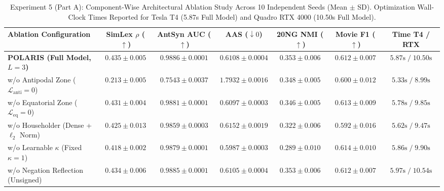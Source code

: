 \documentclass[journal]{IEEEtran}
\begin{document}
\begin{table}[!t]
\centering
\caption{Experiment 5 (Part A): Component-Wise Architectural Ablation Study Across 10 Independent Seeds (Mean $\pm$ SD). Optimization Wall-Clock Times Reported for Tesla T4 (5.87s Full Model) and Quadro RTX 4000 (10.50s Full Model).}
\label{tab:exp5_ablation}
\begin{tabular}{lcccccc}
\toprule
\textbf{Ablation Configuration} & \textbf{SimLex $\rho$ ($\uparrow$)} & \textbf{AntSyn AUC ($\uparrow$)} & \textbf{AAS ($\downarrow 0$)} & \textbf{20NG NMI ($\uparrow$)} & \textbf{Movie F1 ($\uparrow$)} & \textbf{Time T4 / RTX} \\
\midrule
\textbf{POLARIS (Full Model, $L=3$)} & $\mathbf{0.435 \pm 0.005}$ & $\mathbf{0.9886 \pm 0.0001}$ & $0.6108 \pm 0.0004$ & $\mathbf{0.353 \pm 0.006}$ & $0.612 \pm 0.007$ & $5.87\text{s} \;/\; 10.50\text{s}$ \\
w/o Antipodal Zone ($\mathcal{L}_{\text{anti}} = 0$) & $0.213 \pm 0.005$ & $0.7543 \pm 0.0037$ & $1.7932 \pm 0.0016$ & $0.348 \pm 0.005$ & $0.600 \pm 0.012$ & $5.33\text{s} \;/\; 8.99\text{s}$ \\
w/o Equatorial Zone ($\mathcal{L}_{\text{eq}} = 0$) & $0.431 \pm 0.004$ & $0.9881 \pm 0.0001$ & $0.6097 \pm 0.0003$ & $0.346 \pm 0.005$ & $0.613 \pm 0.009$ & $5.78\text{s} \;/\; 9.85\text{s}$ \\
w/o Householder (Dense + $\ell_2$ Norm) & $0.425 \pm 0.013$ & $0.9859 \pm 0.0003$ & $0.6152 \pm 0.0019$ & $0.322 \pm 0.006$ & $0.592 \pm 0.016$ & $5.62\text{s} \;/\; 9.47\text{s}$ \\
w/o Learnable $\kappa$ (Fixed $\kappa = 1$) & $0.418 \pm 0.002$ & $0.9879 \pm 0.0001$ & $\mathbf{0.5987 \pm 0.0003}$ & $0.289 \pm 0.010$ & $\mathbf{0.614 \pm 0.010}$ & $5.86\text{s} \;/\; 9.90\text{s}$ \\
w/o Negation Reflection (Unsigned) & $0.434 \pm 0.006$ & $0.9885 \pm 0.0001$ & $0.6105 \pm 0.0004$ & $\mathbf{0.353 \pm 0.006}$ & $0.612 \pm 0.007$ & $5.97\text{s} \;/\; 10.54\text{s}$ \\
\bottomrule
\end{tabular}
\end{table}
\end{document}
